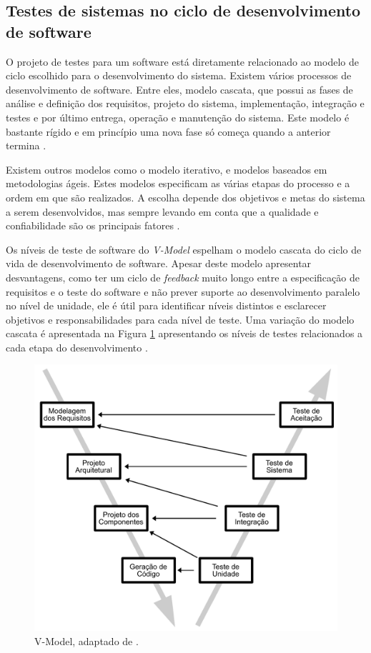 \subsection{Testes de sistemas no ciclo de desenvolvimento de software}

O projeto de testes para um software está diretamente relacionado ao modelo de ciclo escolhido para o desenvolvimento do sistema. Existem vários processos de desenvolvimento de software. Entre eles, modelo cascata, que possui as fases de análise e definição dos requisitos, projeto do sistema, implementação, integração e testes e por último entrega, operação e manutenção do sistema. Este modelo é bastante rígido e em princípio uma nova fase só começa quando a anterior termina \cite{sommerville2010}.

Existem outros modelos como o modelo iterativo, e modelos baseados em metodologias ágeis. Estes modelos especificam as várias etapas do processo e a ordem em que são realizados. A escolha  depende dos objetivos e metas do sistema a serem desenvolvidos, mas sempre levando em conta que a qualidade e confiabilidade são os principais fatores \cite{graham2008foundations}.

Os níveis de teste de software do \textit{V-Model} espelham o modelo cascata do ciclo de vida de desenvolvimento de software. Apesar deste modelo apresentar desvantagens, como ter um ciclo de \textit{feedback} muito longo entre a especificação de requisitos e o teste do software e não prever suporte ao desenvolvimento paralelo no nível de unidade, ele é útil para identificar níveis distintos e esclarecer objetivos e responsabilidades para cada nível de teste. Uma variação do modelo cascata é apresentada na Figura \ref{fig:v-model} apresentando os níveis de testes relacionados a cada etapa do desenvolvimento \cite{jorgensen2016software}. 

\begin{figure}[ht]
\centering
\includegraphics[scale=0.6]{imagens/v-model.pdf}
\caption{V-Model, adaptado de \cite{pressman2005software}.}
\label{fig:v-model}
\end{figure}

